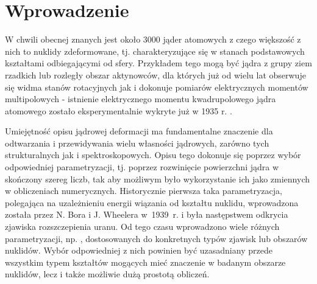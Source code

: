 \documentclass[a4paper,polish]{article}
\numberwithin{equation}{section}
\begin{document}
\clearpage
\section{Wprowadzenie}

W chwili obecnej znanych jest około 3000 jąder atomowych z czego większość z nich to nuklidy zdeformowane, tj. charakteryzujące się w stanach podstawowych kształtami odbiegającymi od sfery. Przykładem tego mogą być jądra z grupy ziem rzadkich lub rozległy obszar aktynowców, dla których już od wielu lat obserwuje się widma stanów rotacyjnych  jak i dokonuje pomiarów elektrycznych momentów multipolowych - istnienie elektrycznego momentu kwadrupolowego jądra atomowego zostało eksperymentalnie wykryte już w 1935 r. \cite{1935}.

Umiejętność opisu jądrowej deformacji ma fundamentalne znaczenie dla odtwarzania i przewidywania wielu własności jądrowych, zarówno tych strukturalnych jak i spektroskopowych. Opisu tego dokonuje się poprzez wybór odpowiedniej parametryzacji, tj. poprzez rozwinięcie powierzchni jądra w skończony szereg liczb, tak aby możliwym było wykorzystanie ich jako zmiennych w obliczeniach numerycznych. Historycznie pierwsza taka parametryzacja, polegająca na uzależnieniu energii wiązania od kształtu nuklidu, wprowadzona została przez N. Bora i J. Wheelera w~1939~r. \cite{1939} i była następstwem odkrycia zjawiska rozszczepienia uranu. Od tego czasu wprowadzono wiele różnych parametryzacji, np. \cite{parametryzacje}, dostosowanych do konkretnych typów zjawisk lub obszarów nuklidów. Wybór odpowiedniej z nich powinien być uzasadniany przede wszystkim typem kształtów mogących mieć znaczenie w badanym obszarze nuklidów, lecz i także możliwie dużą prostotą obliczeń.
\end{document}
